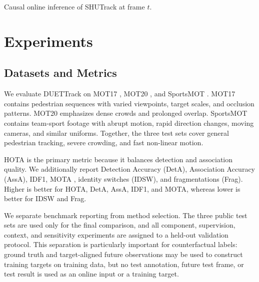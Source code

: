 \documentclass[a4paper,fleqn]{cas-sc}
\begin{document}
\begin{duetalgorithm}{Causal online inference of SHUTrack at frame $t$.}
\end{duetalgorithm}

\section{Experiments}
\subsection{Datasets and Metrics}
We evaluate DUETTrack on MOT17 \cite{dendorfer2021motchallenge}, MOT20 \cite{dendorfer2020mot20}, and SportsMOT \cite{cui2023sportsmot}. MOT17 contains pedestrian sequences with varied viewpoints, target scales, and occlusion patterns. MOT20 emphasizes dense crowds and prolonged overlap. SportsMOT contains team-sport footage with abrupt motion, rapid direction changes, moving cameras, and similar uniforms. Together, the three test sets cover general pedestrian tracking, severe crowding, and fast non-linear motion.

HOTA \cite{luiten2021hota} is the primary metric because it balances detection and association quality. We additionally report Detection Accuracy (DetA), Association Accuracy (AssA), IDF1, MOTA \cite{bernardin2008evaluating}, identity switches (IDSW), and fragmentations (Frag). Higher is better for HOTA, DetA, AssA, IDF1, and MOTA, whereas lower is better for IDSW and Frag.

We separate benchmark reporting from method selection. The three public test sets are used only for the final comparison, and all component, supervision, context, and sensitivity experiments are assigned to a held-out validation protocol. This separation is particularly important for counterfactual labels: ground truth and target-aligned future observations may be used to construct training targets on training data, but no test annotation, future test frame, or test result is used as an online input or a training target.
\end{document}
